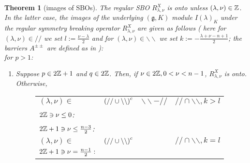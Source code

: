 \documentclass[10pt]{article} %
\newtheorem{theorem}{Theorem}
\theoremstyle{definition}
\newcommand{\even}{2\Z}
\newcommand{\odd}{2\Z+1}
\begin{document}
\begin{theorem}[images of SBOs]
	The regular SBO $R_{\lambda,\nu}^X$ is onto unless $(\lambda,\nu)\in\mathbb{Z}$. In the latter case, the images of the underlying $(\mathfrak{g},K)$ module $I(\lambda)_K$ under the
	regular symmetry breaking operator $R_{\lambda,\nu}^X$ are given as follows (
	here for $(\lambda,\nu)\in//$ we set $l:=\frac{\nu-\lambda}{2}$ and for $(\lambda,\nu)\in\backslash\backslash$ we set
	$k:=-\frac{\lambda+\nu-n+1}{2}$; the barriers $A^{\pm\pm}$ are defined as in \cite{howe1993homogeneous}): \\
	for $p>1$:
	\begin{enumerate}
	\item Suppose $p\in2\mathbb{Z}+1$ and $q\in2\mathbb{Z}$. Then, if $\nu\in2\mathbb{Z},0<\nu<n-1$, $R_{\lambda,\nu}^X$ is onto. Otherwise,
	  \begin{figure}[H]
	    \hskip-1.1cm\noindent\begin{tabular}{m{3cm}ccc}
	      $(\lambda,\nu)\in$&$\left(//\cup\backslash\backslash\right)^c$ & $\backslash\backslash-//$  & $//\cap\backslash\backslash,k> l$\\[15pt]
	      {\vspace{-3cm} $ \even\ni\nu\leq0$}:&\\[15pt]
	      \vspace{-3cm}$\odd\ni\nu\leq\frac{n-3}{2}$:&\\[25pt]
	      $(\lambda,\nu)\in$&$\left(//\cup\backslash\backslash\right)^c$ && $//\cap\backslash\backslash,k=l$\\[15pt]
	      \vspace{-3cm}$\odd\ni\nu=\frac{n-1}{2}:$&\\[25pt]

\end{tabular}
\end{figure}
\end{enumerate}
\end{theorem}
\end{document}
